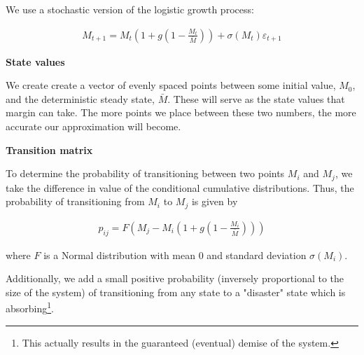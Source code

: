 
We use a stochastic version of the logistic growth process:

\begin{align*}
  M_{t+1} = M_{t} \left(1 + g \left(1 - \frac{M_{t}}{\bar{M}} \right)\right) + \sigma(M_{t}) \varepsilon_{t+1}
\end{align*}

\textbf{State values}

We create create a vector of evenly spaced points between some initial value, $M_0$, and the
deterministic steady state, $\bar{M}$. These will serve as the state values that margin can take.
The more points we place between these two numbers, the more accurate our approximation will become.

\textbf{Transition matrix}

To determine the probability of transitioning between two points $M_i$ and $M_j$, we take the
difference in value of the conditional cumulative distributions. Thus, the probability of
transitioning from $M_i$ to $M_j$ is given by

\begin{align*}
  p_{ij} = F\left(M_j - M_i \left(1 + g \left(1 - \frac{M_i}{\bar{M}}\right) \right) \right)
\end{align*}

where $F$ is a Normal distribution with mean 0 and standard deviation $\sigma(M_i)$.

Additionally, we add a small positive probability (inversely proportional to the size of the system)
of transitioning from any state to a "disaster" state which is absorbing\footnote{This actually
results in the guaranteed (eventual) demise of the system.}.
